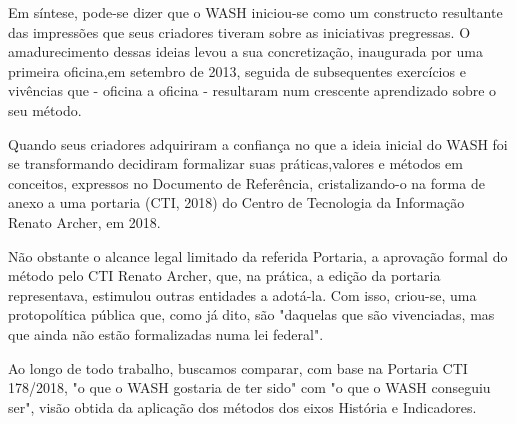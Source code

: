 Em síntese, pode-se dizer que o WASH iniciou-se como um constructo resultante das impressões que seus criadores tiveram sobre as iniciativas pregressas. O amadurecimento dessas ideias levou a sua concretização, inaugurada por uma primeira oficina,em setembro de 2013, seguida de subsequentes exercícios e  vivências que - oficina a oficina - resultaram num crescente aprendizado sobre o seu método.

Quando seus criadores adquiriram a confiança no que a ideia inicial do WASH foi se transformando decidiram formalizar suas práticas,valores e métodos em conceitos, expressos  no Documento de Referência, cristalizando-o na forma de anexo a uma portaria  (CTI, 2018)  do Centro de Tecnologia da Informação Renato Archer, em 2018.

Não obstante o alcance legal limitado da referida Portaria, a aprovação formal do método pelo CTI Renato Archer, que, na prática, a edição da portaria representava, estimulou outras entidades a adotá-la. Com isso, criou-se, uma protopolítica pública que, como já dito, são "daquelas que são vivenciadas, mas que ainda não estão formalizadas numa lei federal".

Ao longo de todo trabalho, buscamos comparar, com base na Portaria CTI 178/2018, "o que o WASH gostaria de ter sido" com "o que o WASH conseguiu ser", visão obtida da aplicação dos métodos dos eixos História e Indicadores.


